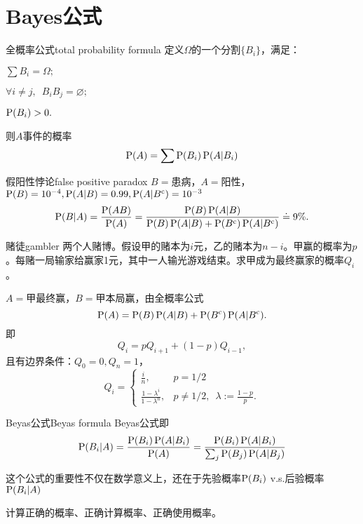 \section{Bayes公式}
\begin{theorem}{全概率公式}{total probability formula}
	定义$\Omega$的一个分割$\{B_i\}$，满足：
	\begin{compactenum}
		\item $\sum B_i=\Omega;$
		\item $\forall i\neq j,\enspace B_iB_j=\varnothing;$
		\item $\P(B_i)>0.$
	\end{compactenum}
	则$A$事件的概率
	\begin{align}
		\P(A)=\sum\P(B_i)\P(A|B_i)
	\end{align}
\end{theorem}
\begin{example}{假阳性悖论}{false positive paradox}
	$B=$患病，$A=$阳性，$\P(B)=10^{-4},\P(A|B)=0.99,\P(A|B\c)=10^{-3}$
	\[
		\P(B|A)=\frac{\P(AB)}{\P(A)}=\frac{\P(B)\P(A|B)}{\P(B)\P(A|B)+\P(B\c)\P(A|B\c)}\doteq 9\%.
	\]
\end{example}
\begin{example}{赌徒}{gambler}
	两个人赌博。假设甲的赌本为$i$元，乙的赌本为$n-i$。甲赢的概率为$p$。每赌一局输家给赢家1元，其中一人输光游戏结束。求甲成为最终赢家的概率$Q_i$。

	$A=$甲最终赢，$B=$甲本局赢，由全概率公式
	\[
		\P(A)=\P(B)\P(A|B)+\P(B\c)\P(A|B\c).
	\]
	即
	\[
		Q_i=pQ_{i+1}+(1-p)Q_{i-1},%
	\]
	且有边界条件：$Q_0=0,Q_n=1$，
	\[
		Q_i=\begin{cases}
			\frac in,&p=1/2\\[2ex]
			\frac{1-\lambda^i}{1-\lambda^n},&p\neq 1/2,\enspace\lambda:=\frac{1-p}p.
		\end{cases}
	\]
\end{example}
\begin{theorem}{Beyas公式}{Beyas formula}
	Beyas公式即
	\begin{align}
		\P(B_i|A)=\frac{\P(B_i)\P(A|B_i)}{\P(A)}=\frac{\P(B_i)\P(A|B_i)}{\sum_j\P(B_j)\P(A|B_j)}
	\end{align}
\end{theorem}
这个公式的重要性不仅在数学意义上，还在于先验概率$\P(B_i)$ v.s.后验概率$\P(B_i|A)$

\begin{remark}
	计算正确的概率、正确计算概率、正确使用概率。
\end{remark}
